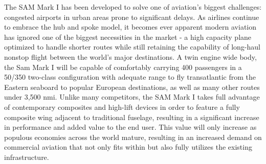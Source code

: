 The SAM Mark I has been developed to solve one of aviation's biggest challenges: congested airports in urban areas prone to significant delays.  As airlines continue to embrace the hub and spoke model, it becomes ever apparent modern aviation has ignored one of the biggest necessities in the market - a high capacity plane optimized to handle shorter routes while still retaining the capability of long-haul nonstop flight between the world's major destinations. A twin engine wide body, the Sam Mark I will be capable of comfortably carrying 400 passengers in a 50/350 two-class configuration with adequate range to fly transatlantic from the Eastern seaboard to popular European destinations, as well as many other routes under 3,500 nmi.  Unlike many competitors, the SAM Mark I takes full advantage of contemporary composites and high-lift devices in order to feature a fully composite wing adjacent to traditional fuselage, resulting in a significant increase in performance and added value to the end user.  This value will only increase as populous economies across the world mature, resulting in an increased demand on commercial aviation that not only fits within but also fully utilizes the existing infrastructure. 

